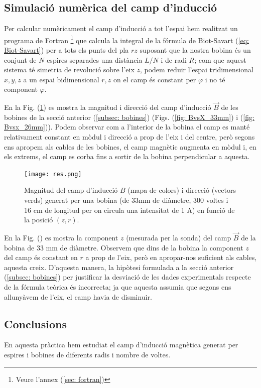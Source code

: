\documentclass[11pt]{article}
\numberwithin{equation}{section}
\numberwithin{figure}{section}
\numberwithin{table}{section}
\begin{document}
\subsection{Simulació numèrica del camp d'inducció} \label{sec: programa}
Per calcular numèricament el camp d'inducció a tot l'espai hem realitzat un programa de Fortran \footnote{Veure l'annex (\ref{sec: fortran})} que calcula la integral de la fórmula de Biot-Savart (\ref{eq: Biot-Savart}) per a tots els punts del pla $rz$ suposant que la nostra bobina és un conjunt de $N$ espires separades una distància $L/N$ i de radi $R$; com que aquest sistema té simetria de revolució sobre l'eix $z$, podem reduir l'espai tridimensional $x, y, z$ a un espai bidimensional $r, z$ on el camp és constant per $\varphi$ i no té component $\varphi$.

En la Fig. (\ref{fig: Bprog}) es mostra la magnitud i direcció del camp d'inducció $\vec{B}$ de les bobines de la secció anterior (\ref{subsec: bobines}) (Figs. (\ref{fig: BvsX_33mm}) i (\ref{fig: Bvsx_26mm})). Podem observar com a l'interior de la bobina el camp es manté relativament constant en mòdul i direcció a prop de l'eix i del centre, però segons ens apropem als cables de les bobines, el camp magnètic augmenta en mòdul i, en els extrems, el camp es corba fins a sortir de la bobina perpendicular a aquesta.

\begin{figure}[H]
    \centering
    \texttt{[image: res.png]}
    \caption{Magnitud del camp d'inducció $B$ (mapa de colors) i direcció (vectors verds) generat per una bobina (de 33mm de diàmetre, 300 voltes i 16 cm de longitud per on circula una intensitat de 1 A) en funció de la posició $(z,r)$.}
    \label{fig: Bprog}
\end{figure}

En la Fig. () es mostra la component $z$ (mesurada per la sonda) del camp $\vec{B}$ de la bobina de 33 mm de diàmetre. Observem que dins de la bobina la component $z$ del camp és constant en $r$ a prop de l'eix, però en apropar-nos suficient als cables, aquesta creix. D'aquesta manera, la hipòtesi formulada a la secció anterior (\ref{subsec: bobines}) per justificar la desviació de les dades experimentals respecte de la fórmula teòrica és incorrecta; ja que aquesta assumia que segons ens allunyàvem de l'eix, el camp havia de disminuir.

\subsection{Conclusions}\label{sec: conclusions}
En aquesta pràctica hem estudiat el camp d'inducció magnètica generat per espires i bobines de diferents radis i nombre de voltes. 
\end{document}
